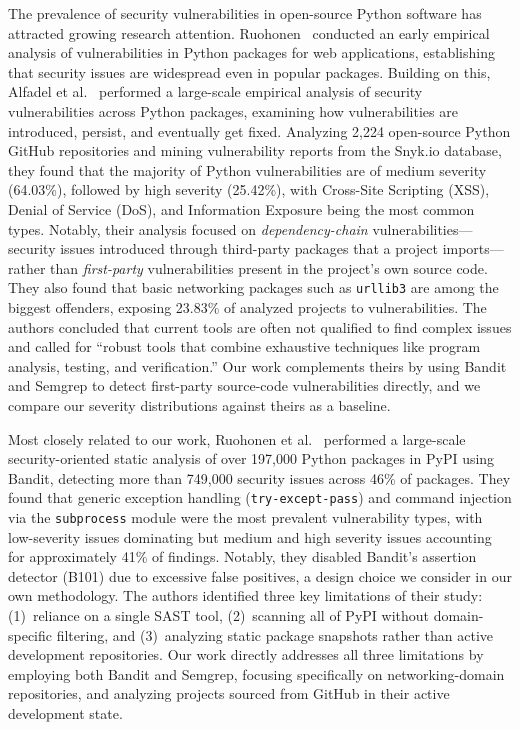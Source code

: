 \documentclass[sigconf,authordraft]{acmart}
\begin{document}
The prevalence of security vulnerabilities in open-source Python
software has attracted growing research attention. Ruohonen~\cite{Ruohonen2018}
conducted an early empirical analysis of vulnerabilities in Python
packages for web applications, establishing that security issues are
widespread even in popular packages. Building on this,
Alfadel et al.~\cite{Alfadel2023} performed a large-scale empirical
analysis of security vulnerabilities across Python packages, examining
how vulnerabilities are introduced, persist, and eventually get fixed.
Analyzing 2,224 open-source Python GitHub repositories and mining
vulnerability reports from the Snyk.io database, they found that
the majority of Python vulnerabilities are of medium severity
(64.03\%), followed by high severity (25.42\%), with Cross-Site
Scripting (XSS), Denial of Service (DoS), and Information Exposure
being the most common types. Notably, their analysis focused on
\emph{dependency-chain} vulnerabilities---security issues introduced
through third-party packages that a project imports---rather than
\emph{first-party} vulnerabilities present in the project's own
source code. They also found that basic networking packages such as
\texttt{urllib3} are among the biggest offenders, exposing 23.83\% of
analyzed projects to vulnerabilities. The authors concluded that
current tools are often not qualified to find complex issues and
called for ``robust tools that combine exhaustive techniques like
program analysis, testing, and verification.'' Our work complements
theirs by using Bandit and Semgrep to detect first-party source-code
vulnerabilities directly, and we compare our severity distributions
against theirs as a baseline.

Most closely related to our work, Ruohonen et al.~\cite{Ruohonen2021}
performed a large-scale security-oriented static analysis of over
197,000 Python packages in PyPI using Bandit, detecting more than
749,000 security issues across 46\% of packages. They found that
generic exception handling (\texttt{try-except-pass}) and command
injection via the \texttt{subprocess} module were the most prevalent
vulnerability types, with low-severity issues dominating but medium
and high severity issues accounting for approximately 41\% of
findings. Notably, they disabled Bandit's assertion detector (B101)
due to excessive false positives, a design choice we consider in our
own methodology. The authors identified three key limitations of their
study: (1)~reliance on a single SAST tool, (2)~scanning all of PyPI
without domain-specific filtering, and (3)~analyzing static package
snapshots rather than active development repositories. Our work
directly addresses all three limitations by employing both Bandit and
Semgrep, focusing specifically on networking-domain repositories, and
analyzing projects sourced from GitHub in their active development
state.
\end{document}
